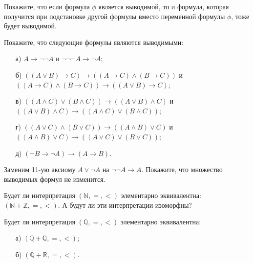 \begin{task}
	Покажите, что если формула $\phi$ является выводимой, то и формула, которая получится при подстановке другой формулы вместо
    переменной формулы $\phi$, тоже будет выводимой.
\end{task}

\begin{task}
	Покажите, что следующие формулы являются выводимыми:
    \begin{enumerate}[topsep = 0pt, itemsep = -1ex]
        \item [а)] $A \to \lnot \lnot A$ и $\lnot \lnot \lnot A \to \lnot A$;
        \item [б)] $((A \lor B) \to C) \to ((A \to C) \land (B \to C))$ и $((A \to C) \land (B \to C)) \to ((A \lor B) \to C)$;
        \item [в)] $((A \land C) \lor (B \land C)) \to ((A \lor B) \land C)$ и $((A \lor B) \land C) \to ((A \land C) \lor (B
			\land C))$;
        \item [г)] $((A \lor C) \land (B \lor C)) \to ((A \land B) \lor C)$ и $((A \land B) \lor C) \to ((A \lor C) \lor
            (B \lor C))$;
        \item [д)] $(\lnot B \to \lnot A) \to (A \to B)$.
    \end{enumerate}
\end{task}

\begin{task}
	Заменим 11-ую аксиому $A \lor \lnot A$ на $\lnot \lnot A \to A$. Покажите, что множество выводимых формул не изменится.
\end{task}


\breakline

\begin{ptask}{51}
    Будет ли интерпретация $(\mathbb{N}, =, <)$ элементарно эквивалентна: $(\mathbb{N} + \mathbb{Z}, =, <)$. А будут ли эти
    интерпретации изоморфны?
\end{ptask}

\begin{ptask}{52}
    Будет ли интерпретация $(\mathbb{Q}, =, <)$ элементарно эквивалентна:
    \begin{enumerate}[topsep = 0pt, itemsep = -1ex]
        \item [а)] $(\mathbb{Q} + \mathbb{Q}, =, <)$;
        \item [б)] $(\mathbb{Q} + \mathbb{R}, =, <)$.
    \end{enumerate}
\end{ptask}